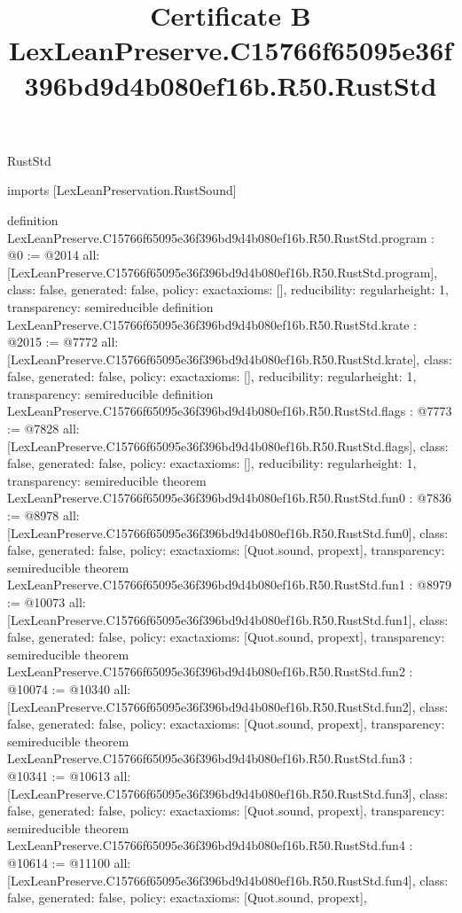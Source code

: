 \begin{lexlean}{RustStd}
\title{Certificate B LexLeanPreserve.C15766f65095e36f396bd9d4b080ef16b.R50.RustStd}
\begin{coremodule}
imports [LexLeanPreservation.RustSound]

definition LexLeanPreserve.C15766f65095e36f396bd9d4b080ef16b.R50.RustStd.program : @0 := @2014 {
  all: [LexLeanPreserve.C15766f65095e36f396bd9d4b080ef16b.R50.RustStd.program],
  class: false,
  generated: false,
  policy: exact{axioms: []},
  reducibility: regular{height: 1},
  transparency: semireducible
}
definition LexLeanPreserve.C15766f65095e36f396bd9d4b080ef16b.R50.RustStd.krate : @2015 := @7772 {
  all: [LexLeanPreserve.C15766f65095e36f396bd9d4b080ef16b.R50.RustStd.krate],
  class: false,
  generated: false,
  policy: exact{axioms: []},
  reducibility: regular{height: 1},
  transparency: semireducible
}
definition LexLeanPreserve.C15766f65095e36f396bd9d4b080ef16b.R50.RustStd.flags : @7773 := @7828 {
  all: [LexLeanPreserve.C15766f65095e36f396bd9d4b080ef16b.R50.RustStd.flags],
  class: false,
  generated: false,
  policy: exact{axioms: []},
  reducibility: regular{height: 1},
  transparency: semireducible
}
theorem LexLeanPreserve.C15766f65095e36f396bd9d4b080ef16b.R50.RustStd.fun0 : @7836 := @8978 {
  all: [LexLeanPreserve.C15766f65095e36f396bd9d4b080ef16b.R50.RustStd.fun0],
  class: false,
  generated: false,
  policy: exact{axioms: [Quot.sound, propext]},
  transparency: semireducible
}
theorem LexLeanPreserve.C15766f65095e36f396bd9d4b080ef16b.R50.RustStd.fun1 : @8979 := @10073 {
  all: [LexLeanPreserve.C15766f65095e36f396bd9d4b080ef16b.R50.RustStd.fun1],
  class: false,
  generated: false,
  policy: exact{axioms: [Quot.sound, propext]},
  transparency: semireducible
}
theorem LexLeanPreserve.C15766f65095e36f396bd9d4b080ef16b.R50.RustStd.fun2 : @10074 := @10340 {
  all: [LexLeanPreserve.C15766f65095e36f396bd9d4b080ef16b.R50.RustStd.fun2],
  class: false,
  generated: false,
  policy: exact{axioms: [Quot.sound, propext]},
  transparency: semireducible
}
theorem LexLeanPreserve.C15766f65095e36f396bd9d4b080ef16b.R50.RustStd.fun3 : @10341 := @10613 {
  all: [LexLeanPreserve.C15766f65095e36f396bd9d4b080ef16b.R50.RustStd.fun3],
  class: false,
  generated: false,
  policy: exact{axioms: [Quot.sound, propext]},
  transparency: semireducible
}
theorem LexLeanPreserve.C15766f65095e36f396bd9d4b080ef16b.R50.RustStd.fun4 : @10614 := @11100 {
  all: [LexLeanPreserve.C15766f65095e36f396bd9d4b080ef16b.R50.RustStd.fun4],
  class: false,
  generated: false,
  policy: exact{axioms: [Quot.sound, propext]},
}
\end{coremodule}
\end{lexlean}
